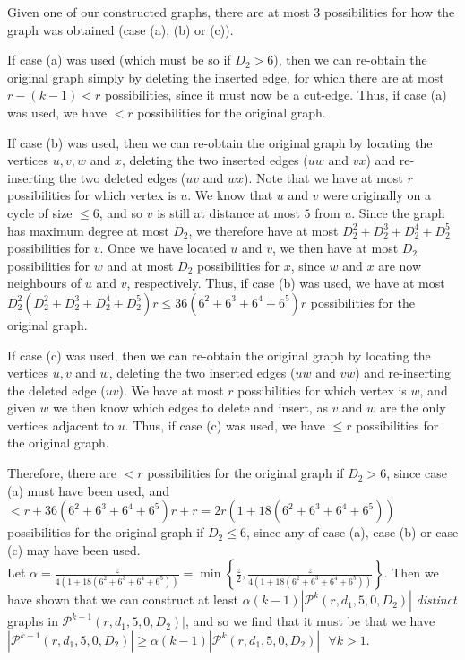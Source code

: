 \documentclass{article}
\newtheorem{Proof of Theorem}{Proof of Theorem}
\begin{document}
Given one of our constructed graphs,
there are at most $3$ possibilities for how the graph was obtained (case (a), (b) or (c)).

If case (a) was used (which must be so if $D_{2} > 6$),
then we can re-obtain the original graph simply by deleting the inserted edge,
for which there are at most $r-(k-1)<r$ possibilities,
since it must now be a cut-edge.
Thus, if case (a) was used, 
we have $<r$ possibilities for the original graph.

If case (b) was used, 
then we can re-obtain the original graph by locating the vertices $u,v,w$ and $x$,
deleting the two inserted edges ($uw$ and $vx$)
and re-inserting the two deleted edges ($uv$ and $wx$).
Note that we have at most $r$ possibilities for which vertex is $u$.
We know that $u$ and $v$ were originally on a cycle of size $\leq 6$,
and so $v$ is still at distance at most $5$ from $u$.
Since the graph has maximum degree at most $D_{2}$,
we therefore have at most $D_{2}^{2}+D_{2}^{3}+D_{2}^{4}+D_{2}^{5}$ possibilities for $v$.
Once we have located $u$ and $v$,
we then have at most $D_{2}$ possibilities for $w$
and at most $D_{2}$ possibilities for $x$,
since $w$ and $x$ are now neighbours of $u$ and $v$, respectively.
Thus, if case (b) was used,
we have at most
$D_{2}^{2}(D_{2}^{2}+D_{2}^{3}+D_{2}^{4}+D_{2}^{5})r \leq 36(6^{2}+6^{3}+6^{4}+6^{5})r$ 
possibilities for the original graph.

If case (c) was used,
then we can re-obtain the original graph by locating the vertices $u,v$ and $w$,
deleting the two inserted edges ($uw$ and $vw$)
and re-inserting the deleted edge ($uv$).
We have at most $r$ possibilities for which vertex is $w$,
and given $w$ we then know which edges to delete and insert,
as $v$ and $w$ are the only vertices adjacent to $u$.
Thus, if case (c) was used,
we have $\leq r$ possibilities for the original graph.

Therefore,
there are $<r$ possibilities for the original graph if $D_{2} > 6$,
since case (a) must have been used,
and 
$< r + 36(6^{2}+6^{3}+6^{4}+6^{5})r +r = 2r(1+18(6^{2}+6^{3}+6^{4}+6^{5}))$ 
possibilities for the original graph if $D_{2} \leq 6$,
since any of case (a), case (b) or case (c) may have been used. \\

Let 
$\alpha = \frac{z}{4(1+18(6^{2}+6^{3}+6^{4}+6^{5}))}
= \min \left\{ \frac{z}{2}, \frac{z}{4(1+18(6^{2}+6^{3}+6^{4}+6^{5}))} \right\}$.
Then we have shown that
we can construct at least
$\alpha(k-1) |\mathcal{P}^{k}(r,d_{1},5,0,D_{2})|$ 
\textit{distinct} graphs in $\mathcal{P}^{k-1}(r,d_{1},5,0,D_{2})|$,
and so we find that it must be that we have
$
|\mathcal{P}^{k-1}(r,d_{1},5,0,D_{2})| \geq \alpha(k-1) |\mathcal{P}^{k}(r,d_{1},5,0,D_{2})| \textrm{ } \forall k>1.
$
\end{document}

